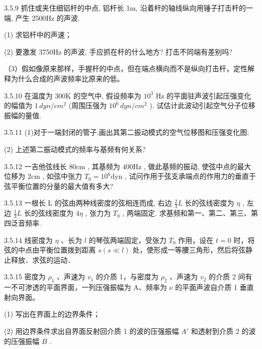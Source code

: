 \begin{problem}{3.5.9}
抓住或夹住细铝杆的中点, 铝杆长 1m, 沿着杆的轴线纵向用锤子打击杆的一端, 产生 2500Hz 的声波.

(1) 求铝杆中的声速；

(2) 要激发 3750Hz 的声波, 手应抓在杆的什么地方? 打击不同端有差别吗?

（3）假如像原来那样，手握杆的中点，但在端点横向而不是纵向打击杆，定性解释为什么合成的声波频率比原来的低。
\end{problem}
\clearpage


\begin{problem}{3.5.10}
在温度为 300K 的空气中, 假设频率为 $10^{3}$ Hz 的平面驻声波引起压强变化的幅值为 $1 \, dyn/cm^{2}$ (周围压强为 $10^{6} \, dyn/cm^{2}$ ). 试估计此波动引起空气分子位移振幅的量值.
\end{problem}
\clearpage


\begin{problem}{3.5.11}
(1)对于一端封闭的管子,画出其第二振动模式的空气位移图和压强变化图;

(2) 上述第二振动模式的频率与基频有何关系?
\end{problem}
\clearpage


\begin{problem}{3.5.12}
一吉他弦线长 $80\mathrm{cm}$ , 其基频为 $400\mathrm{Hz}$ , 做此基频的振动, 使弦中点的最大位移为 $2\mathrm{cm}$ , 如弦中张力 $T_{0} = 10^{6}\mathrm{dyn}$ , 试问作用于弦支承端点的作用力的垂直于弦平衡位置的分量的最大值有多大?
\end{problem}
\clearpage


\begin{problem}{3.5.13}
一根长 L 的弦由两种线密度的弦相连而成, 右边 $\frac{2}{3}L$ 长的弦线密度为 $\eta$ , 左边 $\frac{1}{3}L$ 长的弦线密度为 $4\eta$ , 张力为 $T_{0}$ , 两端固定. 求基频和第一、第二、第三、第四泛音频率.
\end{problem}
\clearpage


\begin{problem}{3.5.14}
线密度为 $\eta$ 、长为 $l$ 的琴弦两端固定，受张力 $T_0$ 作用，设在 $t = 0$ 时，将弦的中点由平衡位置拨到距离 $s(s \ll l)$ 处，使形成一等腰三角形，然后将弦静止释放．求弦的运动．
\end{problem}
\clearpage


\begin{problem}{3.5.15}
密度为 $\rho_{1}$ 、声速为 $v_{1}$ 的介质 1，与密度为 $\rho_{2}$ 、声速为 $v_{2}$ 的介质 2 间有一不可渗透的平面界面，一列压强振幅为 A、频率为 $\nu$ 的平面声波自介质 1 垂直射向界面。

(1) 写出在界面上的边界条件；

(2) 用边界条件求出自界面反射回介质 1 的波的压强振幅 $A'$ 和透射到介质 2 的波的压强振幅 $B$ .
\end{problem}
\clearpage


